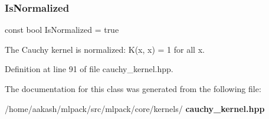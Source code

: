 \subsubsection{Is\+Normalized}
{\footnotesize\ttfamily const bool Is\+Normalized = true\hspace{0.3cm}{\ttfamily [static]}}



The Cauchy kernel is normalized\+: K(x, x) = 1 for all x. 



Definition at line 91 of file cauchy\+\_\+kernel.\+hpp.



The documentation for this class was generated from the following file\+:\begin{DoxyCompactItemize}
\item 
/home/aakash/mlpack/src/mlpack/core/kernels/\textbf{ cauchy\+\_\+kernel.\+hpp}\end{DoxyCompactItemize}
